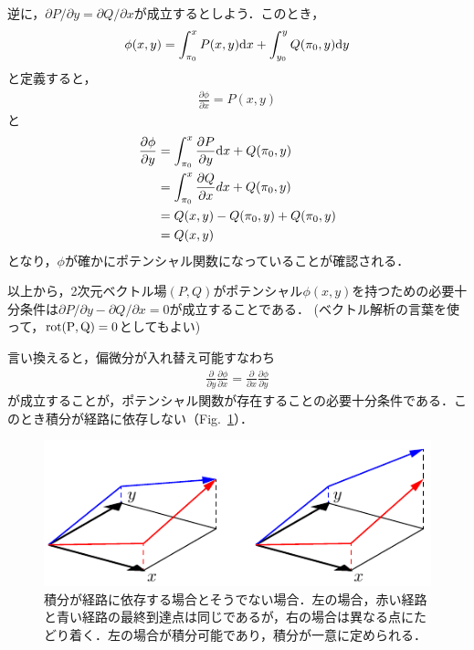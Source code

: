 \documentclass[a4j,10pt]{jsarticle}
\begin{document}
逆に，$\partial P/\partial y = \partial Q /\partial x$が成立するとしよう．このとき，
\begin{align}
    \phi(x,y) = \int_{\pi_0}^x P(x,y){\rm d} x + \int_{y_0}^y Q(\pi_0,y){\rm d} y
\end{align}
と定義すると，
\begin{align*}
    \frac{\partial \phi}{\partial x} = P(x,y)
\end{align*}
と
\begin{align*}
    \frac{\partial \phi}{\partial y}&=\int_{\pi_0}^x \frac{\partial P}{\partial y}{\rm d} x + Q(\pi_0,y)\\
    &=\int_{\pi_0}^x \frac{\partial Q}{\partial x}dx + Q(\pi_0,y)\\
    &= Q(x,y) - Q(\pi_0, y) + Q(\pi_0,y)\\
    &= Q(x,y)
\end{align*}
となり，$\phi$が確かにポテンシャル関数になっていることが確認される．

以上から，2次元ベクトル場$(P,Q)$がポテンシャル$\phi(x,y)$を持つための必要十分条件は$\partial P/\partial y - \partial Q /\partial x=0$が成立することである．
(ベクトル解析の言葉を使って，${\rm rot(P,Q)=0}$としてもよい)

言い換えると，偏微分が入れ替え可能すなわち
\begin{align}
    \frac{\partial}{\partial y}\frac{\partial \phi}{\partial x}=\frac{\partial}{\partial x}\frac{\partial \phi}{\partial y}
\end{align}
が成立することが，ポテンシャル関数が存在することの必要十分条件である．このとき積分が経路に依存しない（Fig.~\ref{fig:integral_path}）．

\begin{figure}
    \centering
    \includegraphics{integral_path.pdf}
    \caption{積分が経路に依存する場合とそうでない場合．左の場合，赤い経路と青い経路の最終到達点は同じであるが，右の場合は異なる点にたどり着く．左の場合が積分可能であり，積分が一意に定められる．}
    \label{fig:integral_path}
\end{figure}
\end{document}
